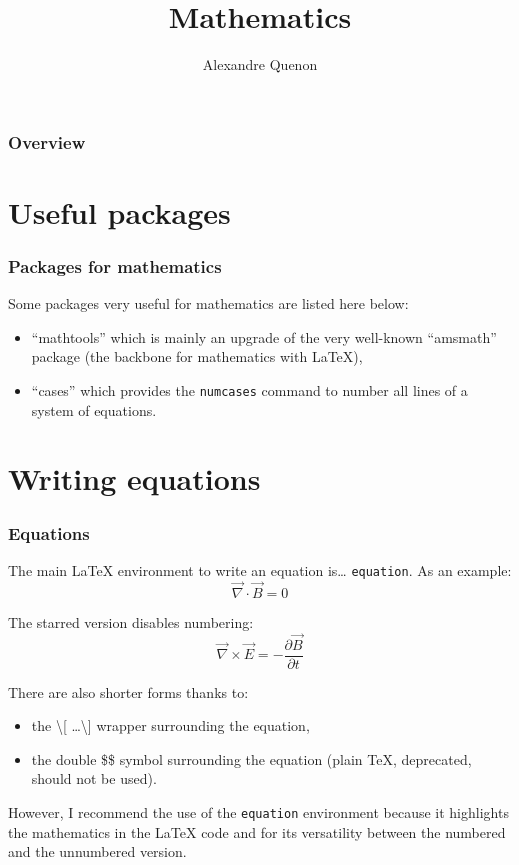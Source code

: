 \documentclass[11pt]{beamer}
\title{Mathematics}
\author[A. Quenon]{Alexandre Quenon}
\begin{document}
\begin{frame}
	\titlepage
\end{frame}


\begin{frame}
	\frametitle{Overview}
	
	\tableofcontents
\end{frame}


\section{Useful packages}

\begin{frame}
	\frametitle{Packages for mathematics}

	Some packages very useful for mathematics are listed here below:
	\begin{itemize}
		\item \enquote{mathtools} which is mainly an upgrade of the very well-known \enquote{amsmath} package (the backbone for mathematics with \LaTeX{}),
		\item \enquote{cases} which provides the \texttt{numcases} command to number all lines of a system of equations.
	\end{itemize}
\end{frame}


\section{Writing equations}

\begin{frame}
	\frametitle{Equations}
	
	The main LaTeX environment to write an equation is\dots{} \texttt{equation}.
	As an example:
	\begin{equation}
		\vec{\nabla}\cdot\vec{B}=0
		\label{eq::Maxwell:no_magnetic_monopole}
	\end{equation}
	
	The starred version disables numbering:
	\begin{equation*}
		\vec{\nabla}\times\vec{E}=-\frac{\partial\vec{B}}{\partial t}
	\end{equation*}
	
	There are also shorter forms thanks to:
	\begin{itemize}
		\item the \textbackslash [ \ldots \textbackslash ] wrapper surrounding the equation,
		\item the double \$\$ symbol surrounding the equation (plain \TeX{}, deprecated, should not be used).
	\end{itemize}
	However, I recommend the use of the \texttt{equation} environment because it highlights the mathematics in the \LaTeX{} code and for its versatility between the numbered and the unnumbered version.
\end{frame}
\end{document}
